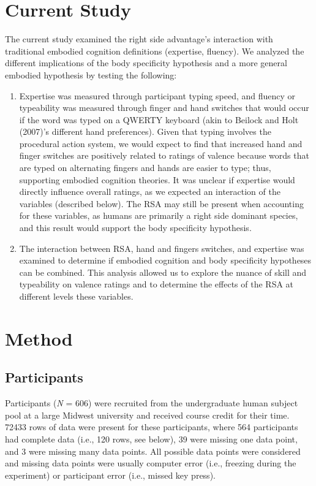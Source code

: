 \documentclass[english,man, mask]{apa6}
\providecommand{\tightlist}{%
  \setlength{\itemsep}{0pt}\setlength{\parskip}{0pt}}
\theoremstyle{definition}
\theoremstyle{definition}
\theoremstyle{definition}
\theoremstyle{remark}
\begin{document}
\section{Current Study}\label{current-study}

The current study examined the right side advantage's interaction with
traditional embodied cognition definitions (expertise, fluency). We
analyzed the different implications of the body specificity hypothesis
and a more general embodied hypothesis by testing the following:

\begin{enumerate}
\def\labelenumi{\arabic{enumi})}
\tightlist
\item
  Expertise was measured through participant typing speed, and fluency
  or typeability was measured through finger and hand switches that
  would occur if the word was typed on a QWERTY keyboard (akin to
  Beilock and Holt (2007)'s different hand preferences). Given that
  typing involves the procedural action system, we would expect to find
  that increased hand and finger switches are positively related to
  ratings of valence because words that are typed on alternating fingers
  and hands are easier to type; thus, supporting embodied cognition
  theories. It was unclear if expertise would directly influence overall
  ratings, as we expected an interaction of the variables (described
  below). The RSA may still be present when accounting for these
  variables, as humans are primarily a right side dominant species, and
  this result would support the body specificity hypothesis.
\item
  The interaction between RSA, hand and fingers switches, and expertise
  was examined to determine if embodied cognition and body specificity
  hypotheses can be combined. This analysis allowed us to explore the
  nuance of skill and typeability on valence ratings and to determine
  the effects of the RSA at different levels these variables.
\end{enumerate}

\section{Method}\label{method}

\subsection{Participants}\label{participants}

Participants (\emph{N} = 606) were recruited from the undergraduate
human subject pool at a large Midwest university and received course
credit for their time. 72433 rows of data were present for these
participants, where 564 participants had complete data (i.e., 120 rows,
see below), 39 were missing one data point, and 3 were missing many data
points. All possible data points were considered and missing data points
were usually computer error (i.e., freezing during the experiment) or
participant error (i.e., missed key press).
\end{document}
